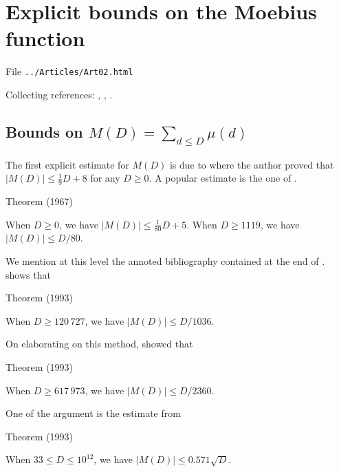 \chapter{   Explicit bounds on the Moebius function}

File \texttt{../Articles/Art02.html}










 
 


Collecting references:
\cite{Diamond-Erdos*80},
\cite{Deleglise-Rivat*96-2},
\cite{Borwein-Ferguson-Mossinghoff*08}.


\section{Bounds on $M(D)=\sum_{d\le D}\mu(d)$
}


The first explicit estimate for $M(D)$ is due to
\cite{VonSterneck*98}
where the author proved that $|M(D)|\le \tfrac19 D+8$ for any $D\ge0$. 
A popular estimate is the one of
\cite{MacLeod*69}.

\begin{thm}{Theorem (1967)}

When $D\ge 0$, we have $|M(D)|\le \tfrac1{80} D+5$. When $D\ge 1119$, we have $|M(D)|\le D/80$.
\end{thm}

We mention at this level the annoted bibliography contained at the end of 
\cite{Dress*83}.
\cite{CostaPereira*89} shows that

\begin{thm}{Theorem (1993)}

When $D\ge 120\,727$, we have $|M(D)|\le D/1036$.
\end{thm}


On elaborating on this method,
\cite{Dress-ElMarraki*93} showed that

\begin{thm}{Theorem (1993)}

When $D\ge 617\,973$, we have $|M(D)|\le D/2360$.
\end{thm}


One of the argument is the estimate from 
\cite{Dress*93}

\begin{thm}{Theorem (1993)}

When $33\le D\le 10^{12}$, we have $|M(D)|\le 0.571\sqrt{D}$.
\end{thm}


